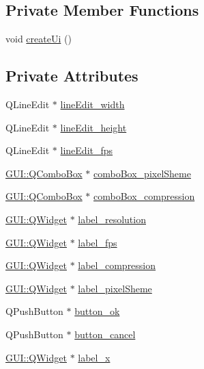 \subsection*{Private Member Functions}
\begin{DoxyCompactItemize}
\item 
void \hyperlink{classGUI_1_1YuvInfoDialog_aa72182c9a958af0e87b65ab7bdba0035}{create\+Ui} ()
\end{DoxyCompactItemize}
\subsection*{Private Attributes}
\begin{DoxyCompactItemize}
\item 
Q\+Line\+Edit $\ast$ \hyperlink{classGUI_1_1YuvInfoDialog_abb7c7fbfdec5ce5cd058e808433d14c3}{line\+Edit\+\_\+width}
\item 
Q\+Line\+Edit $\ast$ \hyperlink{classGUI_1_1YuvInfoDialog_a973158d8be96622d3779272949acacd4}{line\+Edit\+\_\+height}
\item 
Q\+Line\+Edit $\ast$ \hyperlink{classGUI_1_1YuvInfoDialog_a956ff0be70f461ca7b10c0ba7a2ff247}{line\+Edit\+\_\+fps}
\item 
\hyperlink{classGUI_1_1QComboBox}{G\+U\+I\+::\+Q\+Combo\+Box} $\ast$ \hyperlink{classGUI_1_1YuvInfoDialog_a34dd7f437a3e09f3a4657b9cd7345076}{combo\+Box\+\_\+pixel\+Sheme}
\item 
\hyperlink{classGUI_1_1QComboBox}{G\+U\+I\+::\+Q\+Combo\+Box} $\ast$ \hyperlink{classGUI_1_1YuvInfoDialog_a6b925e5ef707952e563c927e5456b6b8}{combo\+Box\+\_\+compression}
\item 
\hyperlink{classGUI_1_1QWidget}{G\+U\+I\+::\+Q\+Widget} $\ast$ \hyperlink{classGUI_1_1YuvInfoDialog_a65d8cf2709a0f533c53d00fe8162c367}{label\+\_\+resolution}
\item 
\hyperlink{classGUI_1_1QWidget}{G\+U\+I\+::\+Q\+Widget} $\ast$ \hyperlink{classGUI_1_1YuvInfoDialog_ac83fcca7edcc057f99a9afeafb5dfef9}{label\+\_\+fps}
\item 
\hyperlink{classGUI_1_1QWidget}{G\+U\+I\+::\+Q\+Widget} $\ast$ \hyperlink{classGUI_1_1YuvInfoDialog_a14c7a7fc5942bc40510fce4c4a930722}{label\+\_\+compression}
\item 
\hyperlink{classGUI_1_1QWidget}{G\+U\+I\+::\+Q\+Widget} $\ast$ \hyperlink{classGUI_1_1YuvInfoDialog_a0a29a71f9272e0ce6a9e4aceb8513257}{label\+\_\+pixel\+Sheme}
\item 
Q\+Push\+Button $\ast$ \hyperlink{classGUI_1_1YuvInfoDialog_ac404fa1107dd730776bc91574e8f3a3f}{button\+\_\+ok}
\item 
Q\+Push\+Button $\ast$ \hyperlink{classGUI_1_1YuvInfoDialog_ab370378f59e456f6179be2167af82034}{button\+\_\+cancel}
\item 
\hyperlink{classGUI_1_1QWidget}{G\+U\+I\+::\+Q\+Widget} $\ast$ \hyperlink{classGUI_1_1YuvInfoDialog_ac095ed51ebccbae706b100b0d7f2e296}{label\+\_\+x}
\end{DoxyCompactItemize}


